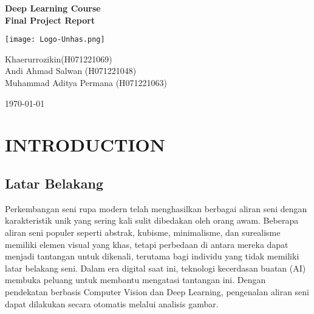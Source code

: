 \documentclass[12pt,a4paper]{article}
\begin{document}
\begin{titlepage}
    \centering
    {\Large\textbf{Deep Learning Course \\ Final Project Report}\par} %
    \vspace{2cm} %
    \texttt{[image: Logo-Unhas.png]}\par %
    \vspace{2cm} %
    {\large
    Khaerurrozikin(H071221069)\\ 
    Andi Ahmad Salwan (H071221048)\\ 
    Muhammad Aditya Permana (H071221063)\par}
    \vspace{1cm} %
    {\large\today\par} %
\end{titlepage}

\normalsize  %
\tableofcontents
\newpage

\section{INTRODUCTION}
\subsection{Latar Belakang }
\begin{adjustwidth}{3em}{0pt} 
\hspace{0.5cm} Perkembangan seni rupa modern telah menghasilkan berbagai aliran seni dengan karakteristik unik yang sering kali sulit dibedakan oleh orang awam. Beberapa aliran seni populer seperti abstrak, kubisme, minimalisme, dan surealisme memiliki elemen visual yang khas, tetapi perbedaan di antara mereka dapat menjadi tantangan untuk dikenali, terutama bagi individu yang tidak memiliki latar belakang seni. Dalam era digital saat ini, teknologi kecerdasan buatan (AI) membuka peluang untuk membantu mengatasi tantangan ini. Dengan pendekatan berbasis Computer Vision dan Deep Learning, pengenalan aliran seni dapat dilakukan secara otomatis melalui analisis gambar.
 \end{adjustwidth}
\
\end{document}

